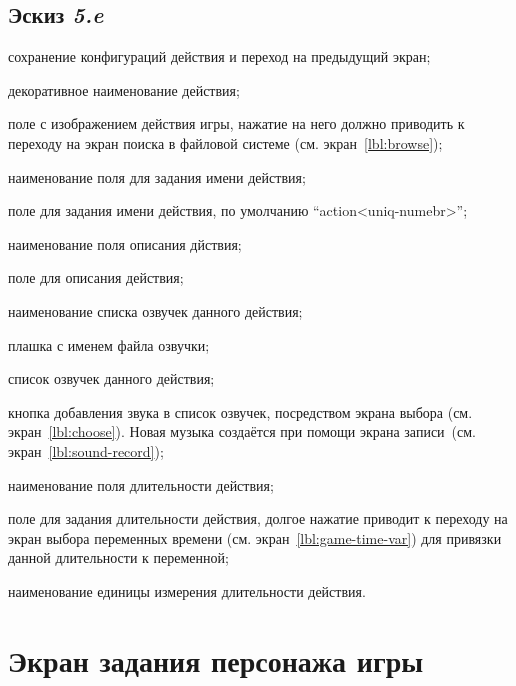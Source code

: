 \subsection{Эскиз \emph{5.e}}
\begin{enumerate*}
    \item сохранение конфигураций действия и переход на предыдущий экран;
    \item декоративное наименование действия;
    \item поле с изображением действия игры, нажатие на него должно приводить к переходу на экран поиска в файловой системе (см. экран~\ref{lbl:browse});
    \item наименование поля для задания имени действия;
    \item поле для задания имени действия, по умолчанию ``action<uniq-numebr>'';
    \item наименование поля описания дйствия;
    \item поле для описания действия;
    \item наименование списка озвучек данного действия;
    \item плашка с именем файла озвучки;
    \item список озвучек данного действия;
    \item кнопка добавления звука в список озвучек, посредством экрана выбора (см. экран~\ref{lbl:choose}). Новая музыка создаётся при помощи экрана записи~(см. экран~\ref{lbl:sound-record});
    \item наименование поля длительности действия;
    \item поле для задания длительности действия, долгое нажатие приводит к переходу на экран выбора переменных времени (см. экран~\ref{lbl:game-time-var}) для привязки данной длительности к переменной;
    \item наименование единицы измерения длительности действия.
\end{enumerate*}

\section{Экран задания персонажа игры}\label{lbl:game-character-new}

